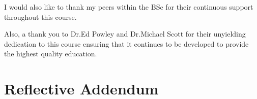 \documentclass[journal]{IEEEtran}
\begin{document}
	I would also like to thank my peers within the BSc for their continuous support throughout this course.
	
	Also, a thank you to Dr.Ed Powley and Dr.Michael Scott for their unyielding dedication to this course ensuring that it continues to be developed to provide the highest quality education.
	
	
	
	
	\section{Reflective Addendum}
	
\end{document}
